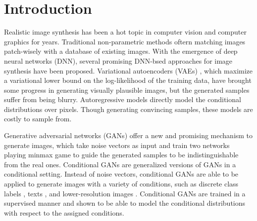 \section{Introduction}
Realistic image synthesis has been a hot topic in computer vision and computer graphics for years. Traditional non-parametric methods \cite{EBSR, TextureSyn,SceneCompletion} oftern matching images patch-wisely with a database of existing images. With the emergence of deep neural networks (DNN), several promising DNN-bsed approaches for image synthesis have been proposed. Variational autoencoders (VAEs) \cite{VAEs}, which maximize a variational lower bound on the log-likelihood of the training data, have brought some progress in generating visually plausible images, but the generated samples suffer from being blurry. Autoregressive models \cite{PixelCNN} directly model the conditional distributions over pixels. Though generating convincing samples, these models are costly to sample from.
%

Generative adversarial networks (GANs) \cite{GANs} offer a new and promising mechanism to generate images, which take noise vectors as input and train two networks playing minmax game to guide the generated samples to be indistinguishable from the real ones. 
Conditional GANs are generalized versions of GANs in a conditional setting. Instead of noise vectors, conditional GANs are able to be applied to generate images with a variety of conditions, such as discrete class labels \cite{cGANs}, texts \cite{StackGANs, StackGANs++}, and lower-resolution images \cite{SRGANs, SR_Cascade}. Conditional GANs are trained in a supervised manner and shown to be able to model the conditional distributions with respect to the assigned conditions.
%

